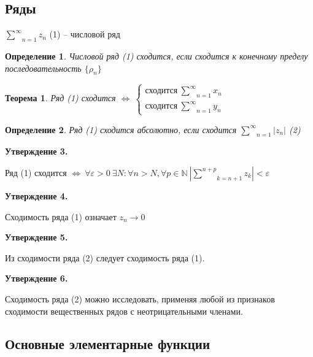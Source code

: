 \documentclass[final]{report}
\newcommand{\N}{\mathbb{N}}
\newcommand{\ind}[3]{\underset{#1}{\overset{#2}{#3}}}
\newcommand{\LRA}{\Leftrightarrow}
\newcommand{\e}{\varepsilon}
\newcommand{\rd}{\underset{n=1}{\overset{\infty}{\sum}}}
\newcommand{\sys}[1]{\left\{\begin{matrix}#1\end{matrix}\right.}
\newcommand{\opr}[1]{\begin{opred}#1\end{opred}}
\newtheorem*{theor}{Теорема}
\newtheorem*{opred}{Определение}
\theoremstyle{remark}
\begin{document}
\subsection{Ряды}

$\ind{n=1}{\infty}{\sum}z_n$ (1) -- числовой ряд

\opr{Числовой ряд (1) сходится, если сходится к конечному пределу последовательность $\{\rho_n\}$}

\begin{theor}
Ряд (1) сходится $\LRA\ \sys{\mbox{сходится}\ \ind{n=1}{\infty}{\sum}x_n \\ \mbox{сходится}\ \ind{n=1}{\infty}{\sum}y_n }$
\end{theor}

\opr{Ряд (1) сходится абсолютно, если сходится $\rd |z_n|$ (2)}

{\bfseries Утверждение 3.}

Ряд (1) сходится $\LRA\ \forall\e>0\ \exists N\colon\forall n>N,\forall p\in\N\ \left|\ind{k=n+1}{n+p}{\sum}z_k\right|<\e$

{\bfseries Утверждение 4.}

Сходимость ряда (1) означает $z_n\to 0$

{\bfseries Утверждение 5.}

Из сходимости ряда (2) следует сходимость ряда (1).

{\bfseries Утверждение 6.}

Сходимость ряда (2) можно исследовать, применяя любой из признаков сходимости вещественных рядов с неотрицательными членами.

\newpage

\subsection{Основные элементарные функции}
\end{document}

